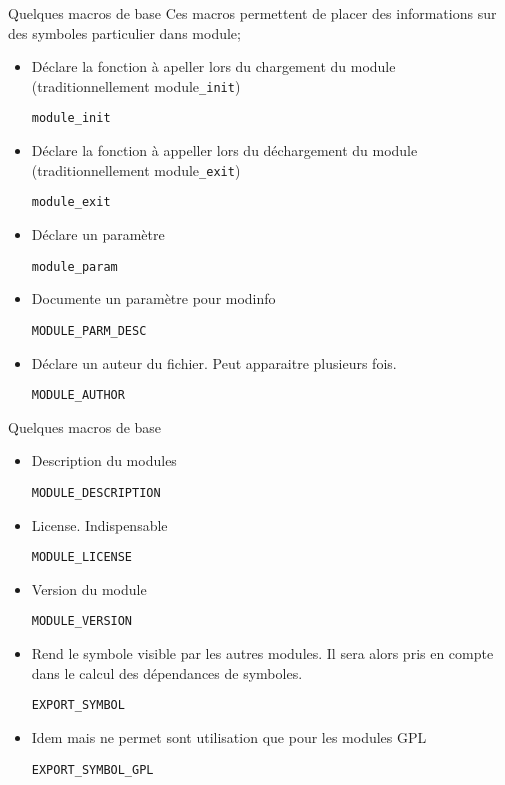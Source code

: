 \begin{frame}[fragile=singleslide]{Quelques macros de base}
  Ces macros  permettent de placer  des informations sur  des symboles
  particulier dans module;
  \begin{itemize} 
  \item Déclare la fonction à apeller lors du chargement du module (traditionnellement module\texttt{\_init})
    \begin{lstlisting} 
module_init
    \end{lstlisting} 
  \item Déclare la fonction à appeller lors du déchargement du module (traditionnellement module\texttt{\_exit})
    \begin{lstlisting} 
module_exit
    \end{lstlisting} 
  \item Déclare un paramètre
    \begin{lstlisting}
module_param
    \end{lstlisting}
  \item Documente un paramètre pour modinfo
    \begin{lstlisting}
MODULE_PARM_DESC
    \end{lstlisting}
  \item Déclare un auteur du fichier. Peut apparaitre plusieurs fois.
    \begin{lstlisting}
MODULE_AUTHOR
    \end{lstlisting}
  \end{itemize}
\end{frame}
\begin{frame}[fragile=singleslide]{Quelques macros de base}
  \begin{itemize} 
  \item Description du modules
    \begin{lstlisting}
MODULE_DESCRIPTION
    \end{lstlisting}
  \item License. Indispensable
    \begin{lstlisting}
MODULE_LICENSE
    \end{lstlisting}
  \item Version du module
    \begin{lstlisting}
MODULE_VERSION
    \end{lstlisting}
  \item Rend le symbole visible par les autres modules.  Il sera alors
    pris en compte dans le calcul des dépendances de symboles.
    \begin{lstlisting}
EXPORT_SYMBOL
    \end{lstlisting} 
  \item Idem  mais  ne permet sont utilisation que
    pour les modules GPL
    \begin{lstlisting}
EXPORT_SYMBOL_GPL
    \end{lstlisting} 
  \end{itemize}
\end{frame}

